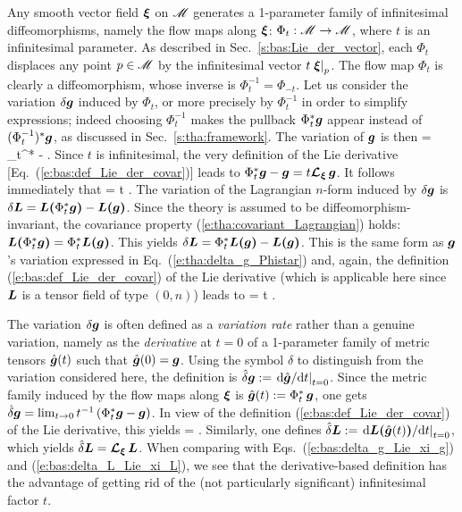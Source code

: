 Any smooth vector field $\bm{\xi}$ on $\mathscr{M}$ generates a 1-parameter family of
infinitesimal diffeomorphisms, namely the flow maps along $\bm{\xi}$:
$\Phi_t: \mathscr{M} \to \mathscr{M}$, where
$t$ is an infinitesimal parameter. As described in Sec.~\ref{s:bas:Lie_der_vector}, each $\Phi_t$ displaces any point $p\in\mathscr{M}$ by the infinitesimal vector $t\left.\bm{\xi}\right| _p$.
The flow map $\Phi_t$ is clearly a diffeomorphism, whose inverse is $\Phi_t^{-1} = \Phi_{-t}$.
Let us consider the variation $\delta\bm{g}$ induced by $\Phi_t$,
or more precisely by $\Phi_t^{-1}$ in order to simplify expressions;
indeed
choosing $\Phi_t^{-1}$ makes the pullback $\Phi_t^*\bm{g}$ appear instead of
$(\Phi_t^{-1})^*\bm{g}$, as discussed in Sec.~\ref{s:tha:framework}.
The variation of $\bm{g}$ is then
\be \label{e:tha:delta_g_Phistar}
    \delta{} = \Phi_t^*  -  .
\ee
Since $t$ is infinitesimal, the very definition of the
Lie derivative [Eq.~(\ref{e:bas:def_Lie_der_covar})] leads to
$\Phi_t^*\bm{g} - \bm{g} = t \bm{\mathcal{L}}_{\bm{\xi}}\, \bm{g}$.
It follows immediately that
\be  \label{e:bas:delta_g_Lie_xi_g}
    \delta{} = t \Lie{\xi}  .
\ee
The variation of the Lagrangian $n$-form induced by $\delta\bm{g}$
is $\delta\bm{L} = \bm{L}\textbf{(}\Phi_t^*\bm{g}\textbf{)} - \bm{L}\textbf{(}\bm{g}\textbf{)}$.
Since the theory is assumed to be diffeomorphism-invariant, the covariance property
(\ref{e:tha:covariant_Lagrangian}) holds: $\bm{L}\textbf{(}\Phi_t^*\bm{g}\textbf{)} = \Phi_t^*\bm{L}\textbf{(}\bm{g}\textbf{)}$.
This yields $\delta\bm{L} = \Phi_t^* \bm{L}\textbf{(}\bm{g}\textbf{)} - \bm{L}\textbf{(}\bm{g}\textbf{)}$. This
is the same form as $\bm{g}$'s variation expressed in Eq.~(\ref{e:tha:delta_g_Phistar}) and, again, the
definition (\ref{e:bas:def_Lie_der_covar}) of the Lie derivative (which is applicable here since
$\bm{L}$ is a tensor field of type $(0,n)$) leads to
\be \label{e:bas:delta_L_Lie_xi_L}
    \delta{} = t \Lie{\xi}  .
\ee

\begin{remark}
The variation $\delta\bm{g}$ is often defined as a \emph{variation rate} rather than a genuine variation, namely
as the \emph{derivative} at $t=0$ of a 1-parameter family of metric tensors $\hat{\bm{g}}(t)$ such that
$\hat{\bm{g}}(0) = \bm{g}$. Using the symbol $\hat\delta$ to distinguish from the variation considered here,
the definition is
$\hat{\delta}\bm{g} := \left. \mathrm{d}{\hat{\bm{g}}}/\mathrm{d}{t} \right|_{t=0}$.
Since the metric family induced by the flow maps along $\bm{\xi}$ is
$\hat{\bm{g}}(t) := \Phi_t^*\, \bm{g}$, one gets
$\hat{\delta}\bm{g} = \lim_{t\to 0} t^{-1} \left( \Phi_t^* \bm{g} - \bm{g} \right)$.
In view of the definition (\ref{e:bas:def_Lie_der_covar}) of the Lie derivative, this yields
\be \label{e:tha:hat_delta_g_Lie}
    \hat{\delta} =  \Lie{\xi}  .
\ee
Similarly, one defines
$\hat{\delta}\bm{L} :=  \left. \mathrm{d}{\bm{L}\textbf{(}\hat{\bm{g}}(t)\textbf{)}}/\mathrm{d} t \right|_{t=0}$,
which yields $\hat{\delta}\bm{L} =  \bm{\mathcal{L}}_{\bm{\xi}}\, \bm{L}$.
When comparing with Eqs.~(\ref{e:bas:delta_g_Lie_xi_g}) and (\ref{e:bas:delta_L_Lie_xi_L}), we see that the derivative-based definition has the advantage of getting rid of the (not particularly significant) infinitesimal factor $t$.
\end{remark}

